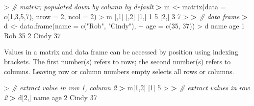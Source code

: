 \documentclass[
]{book}
\newenvironment{Shaded}{\begin{snugshade}}{\end{snugshade}}
\newcommand{\AttributeTok}[1]{\textcolor[rgb]{0.77,0.63,0.00}{#1}}
\newcommand{\CommentTok}[1]{\textcolor[rgb]{0.56,0.35,0.01}{\textit{#1}}}
\newcommand{\DecValTok}[1]{\textcolor[rgb]{0.00,0.00,0.81}{#1}}
\newcommand{\ErrorTok}[1]{\textcolor[rgb]{0.64,0.00,0.00}{\textbf{#1}}}
\newcommand{\FunctionTok}[1]{\textcolor[rgb]{0.00,0.00,0.00}{#1}}
\newcommand{\NormalTok}[1]{#1}
\newcommand{\OtherTok}[1]{\textcolor[rgb]{0.56,0.35,0.01}{#1}}
\newcommand{\SpecialCharTok}[1]{\textcolor[rgb]{0.00,0.00,0.00}{#1}}
\newcommand{\StringTok}[1]{\textcolor[rgb]{0.31,0.60,0.02}{#1}}
\begin{document}
\begin{Shaded}
\begin{Highlighting}[]
\SpecialCharTok{\textgreater{}} \CommentTok{\# matrix; populated down by column by default}
\ErrorTok{\textgreater{}}\NormalTok{ m }\OtherTok{\textless{}{-}} \FunctionTok{matrix}\NormalTok{(}\AttributeTok{data =} \FunctionTok{c}\NormalTok{(}\DecValTok{1}\NormalTok{,}\DecValTok{3}\NormalTok{,}\DecValTok{5}\NormalTok{,}\DecValTok{7}\NormalTok{), }\AttributeTok{nrow =} \DecValTok{2}\NormalTok{, }\AttributeTok{ncol =} \DecValTok{2}\NormalTok{)}
\SpecialCharTok{\textgreater{}}\NormalTok{ m}
\NormalTok{     [,}\DecValTok{1}\NormalTok{] [,}\DecValTok{2}\NormalTok{]}
\NormalTok{[}\DecValTok{1}\NormalTok{,]    }\DecValTok{1}    \DecValTok{5}
\NormalTok{[}\DecValTok{2}\NormalTok{,]    }\DecValTok{3}    \DecValTok{7}
\SpecialCharTok{\textgreater{}} 
\ErrorTok{\textgreater{}} \CommentTok{\# data frame}
\ErrorTok{\textgreater{}}\NormalTok{ d }\OtherTok{\textless{}{-}} \FunctionTok{data.frame}\NormalTok{(}\AttributeTok{name =} \FunctionTok{c}\NormalTok{(}\StringTok{"Rob"}\NormalTok{, }\StringTok{"Cindy"}\NormalTok{),}
\SpecialCharTok{+}                 \AttributeTok{age =} \FunctionTok{c}\NormalTok{(}\DecValTok{35}\NormalTok{, }\DecValTok{37}\NormalTok{))}
\SpecialCharTok{\textgreater{}}\NormalTok{ d}
\NormalTok{   name age}
\DecValTok{1}\NormalTok{   Rob  }\DecValTok{35}
\DecValTok{2}\NormalTok{ Cindy  }\DecValTok{37}
\end{Highlighting}
\end{Shaded}

Values in a matrix and data frame can be accessed by position using indexing brackets. The first number(s) refers to rows; the second number(s) refers to columns. Leaving row or column numbers empty selects all rows or columns.

\begin{Shaded}
\begin{Highlighting}[]
\SpecialCharTok{\textgreater{}} \CommentTok{\# extract value in row 1, column 2}
\ErrorTok{\textgreater{}}\NormalTok{ m[}\DecValTok{1}\NormalTok{,}\DecValTok{2}\NormalTok{]}
\NormalTok{[}\DecValTok{1}\NormalTok{] }\DecValTok{5}
\SpecialCharTok{\textgreater{}} 
\ErrorTok{\textgreater{}} \CommentTok{\# extract values in row 2}
\ErrorTok{\textgreater{}}\NormalTok{ d[}\DecValTok{2}\NormalTok{,]}
\NormalTok{   name age}
\DecValTok{2}\NormalTok{ Cindy  }\DecValTok{37}
\end{Highlighting}
\end{Shaded}
\end{document}
